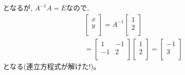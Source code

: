 となるが, $A^{-1}A=E$なので, 
\begin{eqnarray}
&&\begin{bmatrix}
x \\
y \\
\end{bmatrix}
=A^{-1}\begin{bmatrix}
1 \\
2 \\
\end{bmatrix}\nonumber\\
&&=\begin{bmatrix}
1 & -1 \\
-1 & 2 \\
\end{bmatrix}
\begin{bmatrix}
1 \\
2 \\
\end{bmatrix}
=\begin{bmatrix}
-1 \\
3 \\
\end{bmatrix}
\end{eqnarray}
となる(連立方程式が解けた!)。

